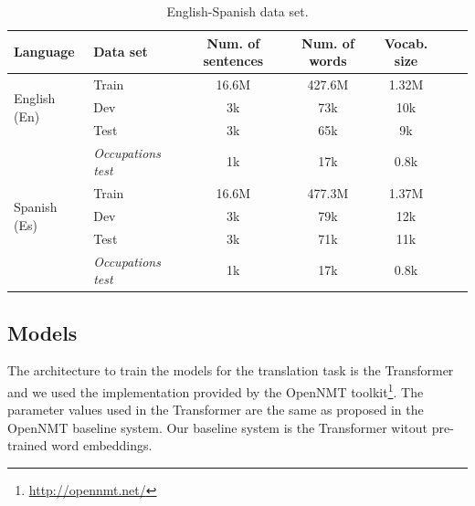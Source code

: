 \documentclass[11pt,a4paper]{article}
\begin{document}
\begin{table}[h!]
\centering
\begin{tabular}{llccccc}  
\toprule
Language & Data set & Num. of sentences & Num. of words & Vocab. size  \\
\midrule
\multirow{3}{*}{English (En) } 
& Train &
16.6M & 427.6M & 1.32M \\
& Dev &
3k & 73k & 10k \\
& Test & 
3k & 65k & 9k \\
& \textit{Occupations test} & 
1k & 17k & 0.8k \\
\midrule
\multirow{3}{*}{Spanish (Es) } 
& Train &
16.6M & 477.3M & 1.37M \\
& Dev &
3k & 79k & 12k \\
& Test & 
3k & 71k & 11k \\
& \textit{Occupations test} & 
1k & 17k & 0.8k \\
\bottomrule
\end{tabular}
\caption{English-Spanish data set.}
\label{tab:dataset}
\end{table}





\subsection{Models}


The architecture to train the models for the translation task is the Transformer \cite{vaswani2017} and we used the implementation provided by the OpenNMT toolkit\footnote{\url{http://opennmt.net/}}. The parameter values used in the Transformer are the same as proposed in the OpenNMT baseline system. Our baseline system is the Transformer witout pre-trained word embeddings.
\end{document}
